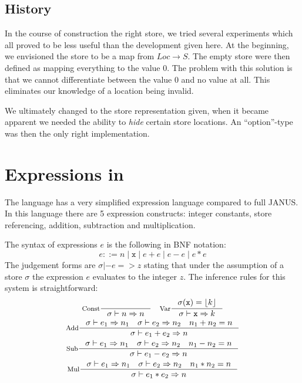 \subsection{History}

In the course of construction the right store, we tried several
experiments which all proved to be less useful than the development
given here. At the beginning, we envisioned the store to be a map from
$Loc \to S$. The empty store were then defined as mapping everything
to the value $0$. The problem with this solution is that we cannot
differentiate between the value $0$ and no value at all. This
eliminates our knowledge of a location being invalid.

We ultimately changed to the store representation given, when it
became apparent we needed the ability to \emph{hide} certain store
locations. An ``option''-type was then the only right implementation.

\section{Expressions in \janusz{}}

The \janusz{} language has a very simplified expression language
compared to full JANUS. In this language there are 5 expression
constructs: integer constants, store referencing, addition,
subtraction and multiplication.

The syntax of expressions $e$ is the following in BNF notation:
\newcommand{\bor}{\; | \;}
\begin{equation*}
  e ::= n \bor \mathtt{x} \bor e + e \bor e - e \bor e * e
\end{equation*}
The judgement forms are $\sigma |- e => z$ stating that under the
assumption of a store $\sigma$ the expression $e$ evaluates to the
integer $z$. The inference rules for this system is straightforward:
\begin{gather*}
  \inference[Const]{}{\sigma |- n => n} \quad \inference[Var]{\sigma(\mathtt{x}) =
    \lift{k}}{\sigma |- \mathtt{x} => k} \\
  \inference[Add]{\sigma |- e_1 => n_1 \quad \sigma |- e_2 => n_2 \quad
    n_1 + n_2 = n}{\sigma |- e_1 + e_2 => n} \\
  \inference[Sub]{\sigma |- e_1 => n_1 \quad \sigma |- e_2 => n_2 \quad
    n_1 - n_2 = n}{\sigma |- e_1 - e_2 => n} \\
  \inference[Mul]{\sigma |- e_1 => n_1 \quad \sigma |- e_2 => n_2 \quad
    n_1 * n_2 = n}{\sigma |- e_1 * e_2 => n}
\end{gather*}


